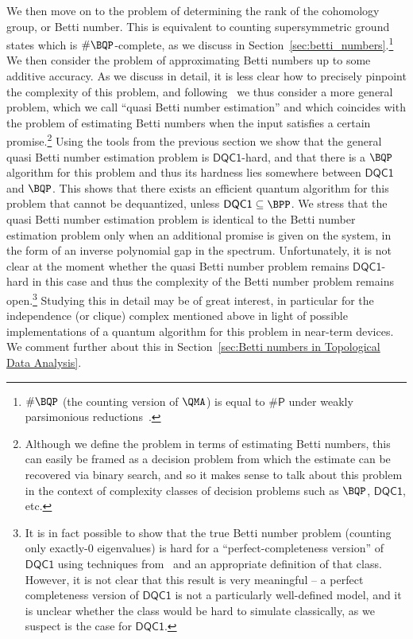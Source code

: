 \documentclass[11pt]{article}
\numberwithin{equation}{section}
\newcommand{\DQC}{\mathsf{DQC1}}
\renewcommand\( {\left(}
\renewcommand\) {\right)}
\newcommand{\sharpP}{\mathsf{\#P}}
\begin{document}
We then move on to the problem of determining the rank of the cohomology group, or Betti number. This is equivalent to counting supersymmetric ground states which is $\#\BQP$-complete, as we discuss in Section~\ref{sec:betti_numbers}.\footnote{$\#\BQP$ (the counting version of $\QMA$) is equal to $\sharpP$ under weakly parsimonious reductions~\cite{Brown_2011}.}
We then consider the problem of approximating Betti numbers up to some additive accuracy. As we discuss in detail, it is less clear how to precisely pinpoint the complexity of this problem, and following~\cite{gyurik} we thus consider a more general problem, which we call ``quasi Betti number estimation'' and which coincides with the problem of estimating Betti numbers when the input satisfies a certain promise.\footnote{Although we define the problem in terms of estimating Betti numbers, this can easily be framed as a decision problem from which the estimate can be recovered via binary search, and so it makes sense to talk about this problem in the context of complexity classes of decision problems such as $\BQP$, $\DQC$, etc.}
Using the tools from the previous section we show that the general quasi Betti number estimation  problem is $\DQC$-hard, and that there is a $\BQP$ algorithm for this problem and thus its hardness lies somewhere between $\DQC$ and $\BQP$. 
This shows that there exists an efficient quantum algorithm for this problem that cannot be dequantized, unless $\DQC \subseteq \BPP$. 
We stress that the quasi Betti number estimation problem is identical to the Betti number estimation problem only when an additional promise is given on the system, in the form of an inverse polynomial gap in the spectrum.
Unfortunately, it is not clear at the moment whether the quasi Betti number problem remains $\DQC$-hard in this case and thus the complexity of the Betti number problem remains open.\footnote{It is in fact possible to show that the true Betti number problem (counting only exactly-0 eigenvalues) is hard for a ``perfect-completeness version'' of $\DQC$ using techniques from~\cite{brandao_thesis} and an appropriate definition of that class. 
However, it is not clear that this result is very meaningful -- a perfect completeness version of $\DQC$ is not a particularly well-defined model, and it is unclear whether the class would be hard to simulate classically, as we suspect is the case for $\DQC$.} 
Studying this in detail may be of great interest, in particular for the independence (or clique) complex mentioned above in light of  possible implementations of a quantum algorithm for this problem in near-term devices.
We comment further about this in Section~\ref{sec:Betti numbers in Topological Data Analysis}. 
\end{document}
